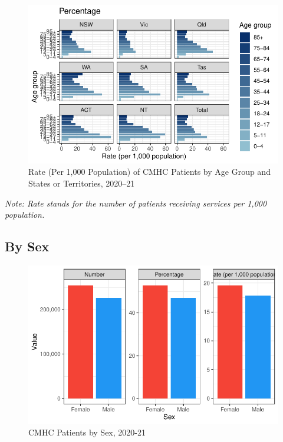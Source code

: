 \documentclass[
  a4paper,
  DIV=11,
  numbers=noendperiod]{scrreport}
\begin{document}
\begin{figure}

\caption{\label{fig-cmhc-asr}Rate (Per 1,000 Population) of CMHC
Patients by Age Group and States or Territories, 2020--21}

{\centering \includegraphics{./chap2-cmhc_files/figure-pdf/fig-cmhc-asr-1.pdf}

}

\end{figure}

\emph{Note: Rate stands for the number of patients receiving services
per 1,000 population.}

\hypertarget{by-sex-3}{%
\subsection{By Sex}\label{by-sex-3}}

\begin{figure}

\caption{\label{fig-cmhc-s}CMHC Patients by Sex, 2020-21}

{\centering \includegraphics{./chap2-cmhc_files/figure-pdf/fig-cmhc-s-1.pdf}

}

\end{figure}
\end{document}
